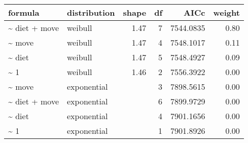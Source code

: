 \begin{table}[ht]
\centering
\begin{tabular}{llrrrr}
 formula & distribution & shape & df & AICc & weight \\ 
  \hline
\~{} diet + move & weibull & 1.47 & 7 & 7544.0835 & 0.80 \\ 
  \~{} move & weibull & 1.47 & 4 & 7548.1017 & 0.11 \\ 
  \~{} diet & weibull & 1.47 & 5 & 7548.4927 & 0.09 \\ 
  \~{} 1 & weibull & 1.46 & 2 & 7556.3922 & 0.00 \\ 
  \~{} move & exponential &  & 3 & 7898.5615 & 0.00 \\ 
  \~{} diet + move & exponential &  & 6 & 7899.9729 & 0.00 \\ 
  \~{} diet & exponential &  & 4 & 7901.1656 & 0.00 \\ 
  \~{} 1 & exponential &  & 1 & 7901.8926 & 0.00 \\ 
  \end{tabular}
\label{tab:er}
\end{table}
